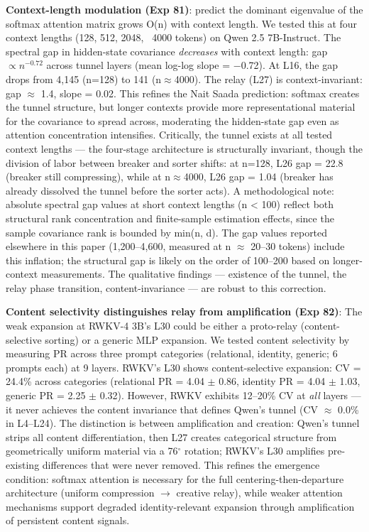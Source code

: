 \documentclass[11pt]{article}
\begin{document}
\textbf{Context-length modulation (Exp 81)}: \citet{naitsaada2024spectral} predict the dominant eigenvalue of the softmax attention matrix grows O(n) with context length. We tested this at four context lengths (128, 512, 2048, ~4000 tokens) on Qwen 2.5 7B-Instruct. The spectral gap in hidden-state covariance \textit{decreases} with context length: gap $\propto n^{-0.72}$ across tunnel layers (mean log-log slope = $-$0.72). At L16, the gap drops from 4,145 (n=128) to 141 (n$\approx$4000). The relay (L27) is context-invariant: gap $\approx$ 1.4, slope = 0.02. This refines the Nait Saada prediction: softmax creates the tunnel structure, but longer contexts provide more representational material for the covariance to spread across, moderating the hidden-state gap even as attention concentration intensifies. Critically, the tunnel exists at all tested context lengths --- the four-stage architecture is structurally invariant, though the division of labor between breaker and sorter shifts: at n=128, L26 gap = 22.8 (breaker still compressing), while at n$\approx$4000, L26 gap = 1.04 (breaker has already dissolved the tunnel before the sorter acts). A methodological note: absolute spectral gap values at short context lengths (n < 100) reflect both structural rank concentration and finite-sample estimation effects, since the sample covariance rank is bounded by min(n, d). The gap values reported elsewhere in this paper (1,200–4,600, measured at n $\approx$ 20–30 tokens) include this inflation; the structural gap is likely on the order of 100–200 based on longer-context measurements. The qualitative findings --- existence of the tunnel, the relay phase transition, content-invariance --- are robust to this correction.

\textbf{Content selectivity distinguishes relay from amplification (Exp 82)}: The weak expansion at RWKV-4 3B's L30 could be either a proto-relay (content-selective sorting) or a generic MLP expansion. We tested content selectivity by measuring PR across three prompt categories (relational, identity, generic; 6 prompts each) at 9 layers. RWKV's L30 shows content-selective expansion: CV = 24.4\% across categories (relational PR = 4.04 $\pm$ 0.86, identity PR = 4.04 $\pm$ 1.03, generic PR = 2.25 $\pm$ 0.32). However, RWKV exhibits 12–20\% CV at \textit{all} layers --- it never achieves the content invariance that defines Qwen's tunnel (CV $\approx$ 0.0\% in L4–L24). The distinction is between amplification and creation: Qwen's tunnel strips all content differentiation, then L27 creates categorical structure from geometrically uniform material via a 76$^\circ$ rotation; RWKV's L30 amplifies pre-existing differences that were never removed. This refines the emergence condition: softmax attention is necessary for the full centering-then-departure architecture (uniform compression $\rightarrow$ creative relay), while weaker attention mechanisms support degraded identity-relevant expansion through amplification of persistent content signals.
\end{document}
